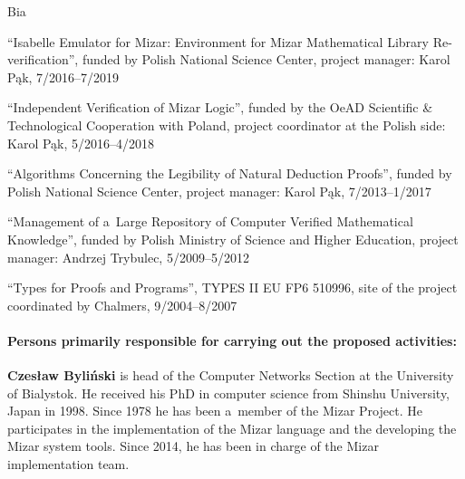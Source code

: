\begin{sitedescription}{Bia}
\begin{compactitem}
\item ``Isabelle Emulator for Mizar: Environment for Mizar Mathematical Library Re-verification'',
funded by Polish National Science Center, project manager: Karol Pąk, 7/2016--7/2019
\item ``Independent Verification of Mizar Logic'', funded by the OeAD Scientific \& Technological Cooperation with Poland,
project coordinator at the Polish side: Karol Pąk, 5/2016--4/2018
\item ``Algorithms Concerning the Legibility of Natural Deduction Proofs'', funded by Polish National Science Center,
project manager: Karol Pąk, 7/2013--1/2017
\item ``Management of a~Large Repository of Computer Verified Mathematical Knowledge'',
funded by Polish Ministry of Science and Higher Education, project manager: Andrzej Trybulec, 5/2009--5/2012
\item ``Types for Proofs and Programs'', TYPES II EU FP6 510996,
site of the project coordinated by Chalmers, 9/2004--8/2007
\end{compactitem}



\paragraph*{Persons primarily responsible for carrying out the proposed activities:}

\begin{compactitem}

\item\textbf{Czesław Byliński} is head of the Computer Networks Section at the University of Bialystok.
He received his PhD in computer science from Shinshu University, Japan in 1998.
Since 1978 he has been a~member of the Mizar Project.
He participates in the implementation of the Mizar language and the developing the Mizar system tools. 
Since 2014, he has been in charge of the Mizar implementation team.


\end{compactitem}
\end{sitedescription}
